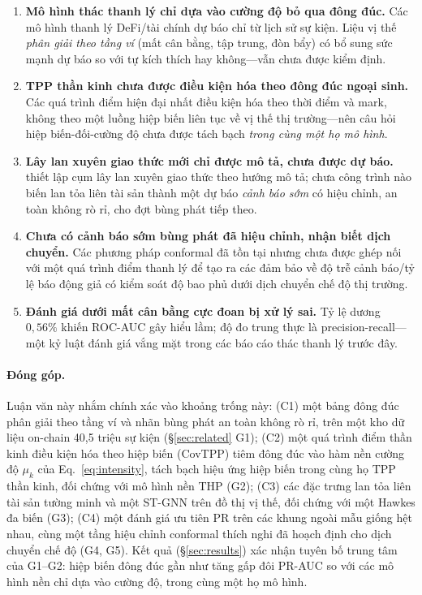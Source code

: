 \documentclass[11pt,a4paper]{article}
\begin{document}
\begin{enumerate}[label=\textbf{G\arabic*:},leftmargin=*]
    \item \textbf{Mô hình thác thanh lý chỉ dựa vào cường độ bỏ qua đông đúc.} Các mô hình thanh lý DeFi/tài chính \citep{cao2025defi,bacry2015hawkes,hardiman2013endogeneity} dự báo chỉ từ lịch sử sự kiện. Liệu vị thế \emph{phân giải theo tầng ví} (mất cân bằng, tập trung, đòn bẩy) có bổ sung sức mạnh dự báo so với tự kích thích hay không---vẫn chưa được kiểm định.
    \item \textbf{TPP thần kinh chưa được điều kiện hóa theo đông đúc ngoại sinh.} Các quá trình điểm hiện đại nhất \citep{zuo2020thp,mei2017neuralhawkes,du2016rmtpp} điều kiện hóa theo thời điểm và mark, không theo một luồng hiệp biến liên tục về vị thế thị trường---nên câu hỏi hiệp biến-đối-cường độ chưa được tách bạch \emph{trong cùng một họ mô hình}.
    \item \textbf{Lây lan xuyên giao thức mới chỉ được mô tả, chưa được dự báo.} \citet{cao2025defi} thiết lập cụm lây lan xuyên giao thức theo hướng mô tả; chưa công trình nào biến lan tỏa liên tài sản thành một dự báo \emph{cảnh báo sớm} có hiệu chỉnh, an toàn không rò rỉ, cho đợt bùng phát tiếp theo.
    \item \textbf{Chưa có cảnh báo sớm bùng phát đã hiệu chỉnh, nhận biết dịch chuyển.} Các phương pháp conformal \citep{gibbs2021adaptive,zaffran2022adaptive} đã tồn tại nhưng chưa được ghép nối với một quá trình điểm thanh lý để tạo ra các đảm bảo về độ trễ cảnh báo/tỷ lệ báo động giả có kiểm soát độ bao phủ dưới dịch chuyển chế độ thị trường.
    \item \textbf{Đánh giá dưới mất cân bằng cực đoan bị xử lý sai.} Tỷ lệ dương $0{,}56\%$ khiến ROC-AUC gây hiểu lầm; độ đo trung thực là precision-recall---một kỷ luật đánh giá vắng mặt trong các báo cáo thác thanh lý trước đây.
\end{enumerate}

\paragraph{Đóng góp.} Luận văn này nhắm chính xác vào khoảng trống này: (C1) một bảng đông đúc phân giải theo tầng ví và nhãn bùng phát an toàn không rò rỉ, trên một kho dữ liệu on-chain 40,5 triệu sự kiện (\S\ref{sec:related} G1); (C2) một quá trình điểm thần kinh điều kiện hóa theo hiệp biến (CovTPP) tiêm đông đúc vào hàm nền cường độ $\mu_k$ của Eq.~\eqref{eq:intensity}, tách bạch hiệu ứng hiệp biến trong cùng họ TPP thần kinh, đối chứng với mô hình nền THP (G2); (C3) các đặc trưng lan tỏa liên tài sản tường minh và một ST-GNN trên đồ thị vị thế, đối chứng với một Hawkes đa biến (G3); (C4) một đánh giá ưu tiên PR trên các khung ngoài mẫu giống hệt nhau, cùng một tầng hiệu chỉnh conformal thích nghi đã hoạch định cho dịch chuyển chế độ (G4, G5). Kết quả (\S\ref{sec:results}) xác nhận tuyên bố trung tâm của G1--G2: hiệp biến đông đúc gần như tăng gấp đôi PR-AUC so với các mô hình nền chỉ dựa vào cường độ, trong cùng một họ mô hình.
\end{document}
